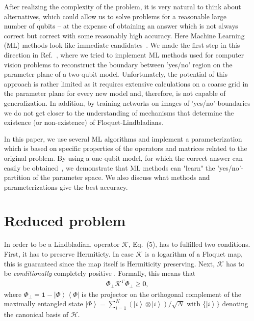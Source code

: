 \documentclass[%
 aip,
 floatfix,
 amsmath,amssymb,
 reprint,%
]{revtex4-1}
\newcommand{\id}{\mathbf{1}}
\newcommand{\ket}[1]{{\left|  #1 \right\rangle}}
\newcommand{\bra}[1]{{\left\langle  #1 \right|}}
\begin{document}
 
After realizing the complexity of the problem, it is very natural to think about alternatives, which could allow us to solve problems for a reasonable large number of qubits -- at the expense of obtaining an answer which is not always correct but correct with some reasonably  high accuracy. Here Machine Learning (ML) methods look like immediate candidates~\cite{rmp2019}.  We made the first step in this direction in Ref.~\cite{X4}, where we tried to implement ML methods used for computer vision problems to reconstruct the boundary between 'yes/no' region on the parameter plane of  a two-qubit model. Unfortunately, the potential of this approach is rather limited as it requires extensive calculations on a coarse grid in the parameter plane for every new model and, therefore, is not capable of generalization. In addition, by training networks on images of 'yes/no'-boundaries we do not get closer to the understanding of mechanisms that determine the existence  (or non-existence) of Floquet-Lindbladians. 


In this paper, we use several ML algorithms and implement a parameterization which is based on specific properties of the operators and matrices related to the original problem. By using a one-qubit model, for which the correct answer can easily be obtained~\cite{X1,X4}, we demonstrate that  ML methods can "learn" the 'yes/no'-partition of the parameter space. We also discuss what methods and parameterizations give the best accuracy. 

\section{Reduced problem \label{sec:2}}

In order to be a Lindbladian, operator $\mathcal{K}$, Eq.~(5), has to fulfilled two conditions. First, it has to  preserve Hermiticty. In case $\mathcal{K}$ is a logarithm of a Floquet map, this is guaranteed since the map itself is Hermiticity preserving. Next, $\mathcal{K}$ has to be \emph{conditionally} completely positive \cite{X1}. Formally, this means that 
\begin{align}
\Phi_{\perp} \mathcal{K}^\Gamma\Phi_{\perp} \geq 0,
\label{eq:test-cond-comp}
\end{align}
where $\Phi_{\perp} = \id - \ket{\Phi}\bra{\Phi}$ is the projector on the orthogonal complement of the maximally entangled state 
$\ket{\Phi}=\sum_{i=1}^N \left(\ket{i} \otimes \ket{i}\right)/\sqrt{N}$ with $\lbrace\ket{i}\rbrace$ denoting the canonical basis of ${\mathcal{H}}$. 
\end{document}
